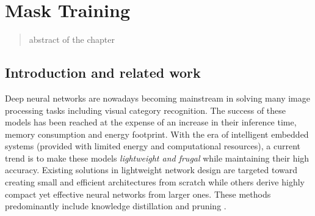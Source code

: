 \chapter{Mask Training}

\begin{abstract}
    abstract of the chapter
\end{abstract}

\section{Introduction and related work}
Deep neural networks are nowadays becoming mainstream in solving many image
processing tasks including visual category recognition. The success of these
models has been reached at the expense of an increase in their inference time,
memory consumption and energy footprint. With the era of intelligent embedded
systems (provided with limited energy and computational resources), a current
trend is to make these models {\it lightweight and frugal} while maintaining
their high accuracy.   Existing solutions in lightweight network design are
targeted toward creating small and efficient architectures from scratch
\cite{DBLP:conf/cvpr/HuangLMW18, DBLP:conf/cvpr/SandlerHZZC18,
DBLP:journals/corr/HowardZCKWWAA17, DBLP:conf/icml/TanL19} while others derive
highly compact yet effective neural networks from larger ones. These methods
predominantly include knowledge distillation
\cite{DBLP:journals/corr/HintonVD15, DBLP:conf/iclr/ZagoruykoK17,
DBLP:journals/corr/RomeroBKCGB14, DBLP:conf/aaai/MirzadehFLLMG20,
DBLP:conf/cvpr/ZhangXHL18, DBLP:conf/cvpr/AhnHDLD19} and pruning
\cite{DBLP:conf/nips/CunDS89, DBLP:conf/nips/HassibiS92,
DBLP:conf/nips/HanPTD15}. \\  

